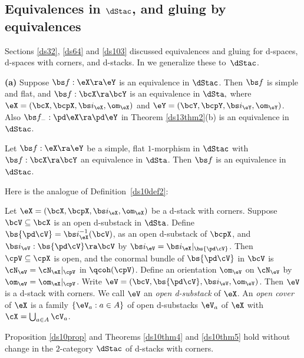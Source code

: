 \documentclass{article}
\begin{document}
\subsection{Equivalences in $\dStac$, and gluing by equivalences}
\label{ds134}

Sections \ref{ds32}, \ref{ds64} and \ref{ds103} discussed
equivalences and gluing for d-spaces, d-spaces with corners, and
d-stacks. In \cite[\S 11.4]{Joyc6} we generalize these to~$\dStac$.

\begin{prop}{\bf(a)} Suppose\/ $\bs f:\eX\ra\eY$ is an equivalence
in $\dStac$. Then $\bs f$ is simple and flat, and\/
$\bs f:\bcX\ra\bcY$ is an equivalence in\/ $\dSta,$ where
$\eX=(\bcX,\bcpX,\bs i_\eX,\om_\eX)$ and\/ $\eY=(\bcY,\bcpY,\bs
i_\eY,\om_\eY)$. Also\/ $\bs f_-:\pd\eX\ra\pd\eY$ in Theorem\/
{\rm\ref{ds13thm2}(b)} is an equivalence in\/~$\dStac$.
\smallskip

 Let\/ $\bs f:\eX\ra\eY$ be a simple, flat\/
$1$-morphism in $\dStac$ with\/ $\bs f:\bcX\ra\bcY$ an equivalence
in\/ $\dSta$. Then $\bs f$ is an equivalence in\/~$\dStac$.
\label{ds13prop1}
\end{prop}

Here is the analogue of Definition~\ref{ds10def2}:

\begin{dfn} Let $\eX=(\bcX,\bcpX,\bs i_\eX,\om_\eX)$ be a d-stack
with corners. Suppose $\bcV\subseteq\bcX$ is an open d-substack in
$\dSta$. Define $\bs{\pd\cV}=\bs i_\eX^{-1}(\bcV)$, as an open
d-substack of $\bcpX$, and $\bs i_\eV:\bs{\pd\cV}\ra\bcV$ by $\bs
i_\eV=\bs i_\eX\vert_{\bs{\pd\cV}}$. Then $\cpV\subseteq\cpX$ is
open, and the conormal bundle of $\bs{\pd\cV}$ in $\bcV$ is
$\cN_\eV=\cN_\eX\vert_\cpV$ in $\qcoh(\cpV)$. Define an orientation
$\om_\eV$ on $\cN_\eV$ by $\om_\eV=\om_\eX\vert_\cpV$. Write
$\eV=(\bcV,\bs{\pd\cV},\bs i_\eV,\om_\eV)$. Then $\eV$ is a d-stack
with corners. We call $\eV$ an {\it open d-substack\/} of $\eX$. An
{\it open cover\/} of $\eX$ is a family $\{\eV_a:a\in A\}$ of open
d-substacks $\eV_a$ of $\eX$ with~$\cX=\bigcup_{a\in
A}\cV_a$.
\label{ds13def2}
\end{dfn}

\begin{thm} Proposition\/ {\rm\ref{ds10prop}} and Theorems\/
{\rm\ref{ds10thm4}} and\/ {\rm\ref{ds10thm5}} hold without change in
the $2$-category\/ $\dStac$ of d-stacks with corners.
\label{ds13thm3}
\end{thm}
\end{document}
